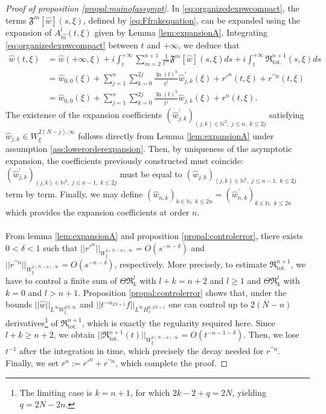\documentclass[a4paper, 15pt]{article}
\numberwithin{equation}{section}
\begin{document}
\begin{proof}[Proof of proposition \ref{propal:mainofassympt}]
In \eqref{eq:organizedexpwcompact}, the terms $\mathfrak{F}^m[\hat{w}](s,\xi)$, defined by \eqref{eq:Ffrakequation}, can be expanded using the expansion of $A^l_{\overrightarrow{m}}(t,\xi)$ given by Lemma \ref{lem:expansionA}. Integrating \eqref{eq:organizedexpwcompact} between $t$ and $+\infty$, we deduce that 
\begin{align*}
    \hat{w}(t,\xi)&=\hat{w}(+\infty,\xi)+i\int^{+\infty}_t\sum_{m=2}^{n+1}\frac{1}{t^m}\mathfrak{F}^m[\hat{w}](s,\xi)ds+i\int^{+\infty}_t\mathfrak{R}^{n+1}_{\text{tot.}}(s,\xi)ds\\
&=\hat{w}_{0,0}(\xi)+\sum_{j=1}^{n}\sum^{2j}_{k=0}\frac{\ln(t)^k}{t^j}\hat{w}^{\prime}_{j,k}(\xi)+r'^{n}(t,\xi)+r^{\prime\prime n}(t,\xi)\\
&=\hat{w}_{0,0}(\xi)+\sum_{j=1}^{n}\sum^{2j}_{k=0}\frac{\ln(t)^k}{t^j}\hat{w}_{j,k}(\xi)+r^{n}(t,\xi).
\end{align*}
The existence of the expansion coefficients 
$(\hat{w}_{j,k}^\prime)_{(j,k)\in\mathbb{N}^{2},\;j\leq n,\;k\leq 2j}$ satisfying $\hat{w}_{j,k}\in  W^{2(N-j),\infty}_\xi$ follows directly from Lemma \ref{lem:expansionA} under assumption \ref{ass:lowerorderexpansion}. Then, by uniqueness of the asymptotic expansion, the coefficients previously constructed must coincide:
$(\hat{w}_{j,k}^\prime)_{(j,k)\in\mathbb{N}^{2},\;j\leq n-1,\;k\leq 2j}$ must be equal to $(\hat{w}_{j,k})_{(j,k)\in\mathbb{N}^{2},\;j\leq n-1,\;k\leq 2j}$ term by term. Finally, we may define $(\hat{w}_{n,k})_{k\in\mathbb{N},\; k\leq2n}=(\hat{w}_{n,k}^\prime)_{k\in\mathbb{N},\; k\leq2n}$ which provides the expansion coefficients at order $n$. \\\\
From lemma \ref{lem:expansionA} and proposition \ref{propal:controlerror}, there exists $0<\delta<1$ such that $||r'^{n}||_{W^{2(N-n),\infty}_\xi}=O(s^{-n-\delta})$ and $||r^{\prime\prime n}||_{W^{2(N-n),\infty}_\xi}=O(s^{-n-\delta})$, respectively. More precisely, to estimate $\mathfrak{R}^{n+1}_{\text{tot.}}$, we have to control a finite sum of $\Theta\mathfrak{R}^l_k$ with $l+k=n+2$ and $l\geq1$ and $\Theta\mathfrak{R}^l_k$ with $k=0$ and $l>n+1$. Proposition \ref{propal:controlerror} shows that, under the bounds $||\hat{w}||_{L^\infty W^{2N,\infty}_\xi}$ and $||t^{-\alpha_{2N+1}}f||_{L^\infty H^{0,2N+1}_x}$ one can control up to $2(N-n)$ derivatives\footnote{The limiting case is $k=n+1$, for which $2k-2+q=2N$, yielding $q=2N-2n$.} of $\mathfrak{R}^{n+1}_{\text{tot.}}$, which is exactly the regularity required here. Since $l+k\geq n+2$, we obtain $||\mathfrak{R}^{n+1}_{\text{tot.}}(t)||_{W^{2(N-n),\infty}_\xi}=O(t^{-n-1-\delta})$. Then, we lose $t^{-1}$ after the integration in time, which precisely the decay needed for $r^{\prime\prime n}$. Finally, we set $r^{n}:=r'^{n}+r^{\prime\prime n}$, which complete the proof.
\end{proof} 
\end{document}
